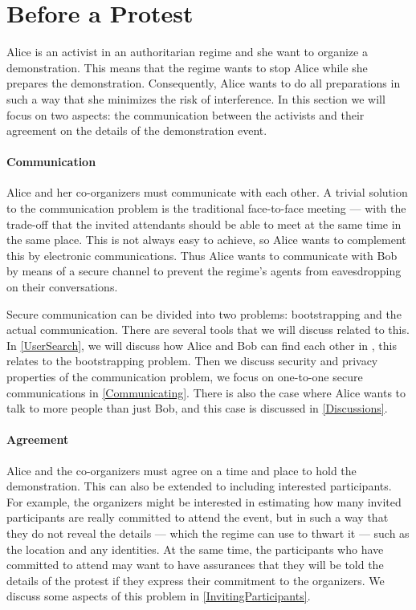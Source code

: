 \section{Before a Protest}
\label{BeforeProtest}

Alice is an activist in an authoritarian regime and she want to organize 
a demonstration.
This means that the regime wants to stop Alice while she prepares the 
demonstration.
Consequently, Alice wants to do all preparations in such a way that she 
minimizes the risk of interference.
In this section we will focus on two aspects: the communication between the 
activists and their agreement on the details of the demonstration event.

\paragraph{Communication}

Alice and her co-organizers must communicate with each other.
A trivial solution to the communication problem is the traditional face-to-face 
meeting --- with the trade-off that the invited attendants should be able to 
meet at the same time in the same place.
This is not always easy to achieve, so Alice wants to complement this by 
electronic communications.
Thus Alice wants to communicate with Bob by means of a secure channel to 
prevent the regime's agents from eavesdropping on their conversations.

Secure communication can be divided into two problems: bootstrapping and the 
actual communication.
There are several tools that we will discuss related to this.
In \cref{UserSearch}, we will discuss how Alice and Bob can find each other in 
, this relates to the bootstrapping problem.
Then we discuss security and privacy properties of the communication problem, 
we focus on one-to-one secure communications in \cref{Communicating}.
There is also the case where Alice wants to talk to more people than just Bob, 
and this case is discussed in \cref{Discussions}.

\paragraph{Agreement}

Alice and the co-organizers must agree on a time and place to hold the 
demonstration.
This can also be extended to including interested participants.
For example, the organizers might be interested in estimating how many invited 
participants are really committed to attend the event, but in such a way that 
they do not reveal the details --- which the regime can use to thwart it --- 
such as the location and any identities.
At the same time, the participants who have committed to attend may want to 
have assurances that they will be told the details of the protest if they 
express their commitment to the organizers.
We discuss some aspects of this problem in \cref{InvitingParticipants}.










%
